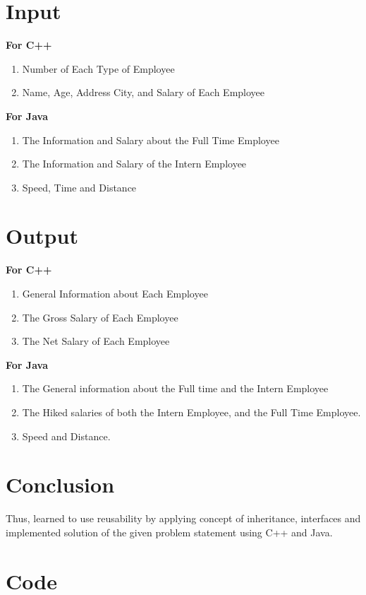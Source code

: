 \documentclass[11pt]{article}
\begin{document}
\section{Input}
\textbf{For C++}
\begin{enumerate}
	\item Number of Each Type of Employee
	\item Name, Age, Address City, and Salary of Each Employee
\end{enumerate}
\textbf{For Java}
\begin{enumerate}
	\item The Information and Salary about the Full Time Employee
	\item The Information and Salary of the Intern Employee
	\item Speed, Time and Distance
\end{enumerate}

\section{Output}
\textbf{For C++}
\begin{enumerate}
	\item General Information about Each Employee
	\item The Gross Salary of Each Employee
	\item The Net Salary of Each Employee
\end{enumerate}

\textbf{For Java}
\begin{enumerate}
	\item The General information about the Full time and the Intern Employee
	\item The Hiked salaries of both the Intern Employee, and the Full Time Employee. 
	\item Speed and Distance. 
\end{enumerate}

\section{Conclusion}
Thus, learned to use reusability by applying concept of inheritance, interfaces and
implemented solution of the given problem statement using C++ and Java.

\section{Code}
\end{document}
